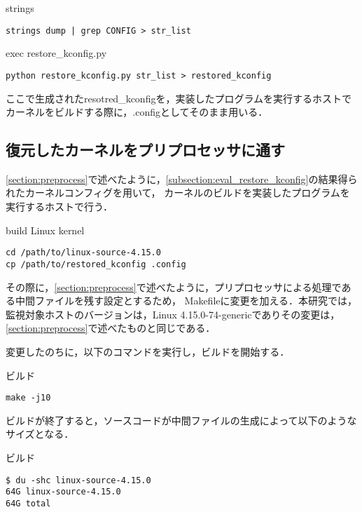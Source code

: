 \begin{itembox}[l]{strings}
    \begin{verbatim}
strings dump | grep CONFIG > str_list
    \end{verbatim}
\end{itembox}

\begin{itembox}[l]{exec restore_kconfig.py}
    \begin{verbatim}
python restore_kconfig.py str_list > restored_kconfig
    \end{verbatim}
\end{itembox}

ここで生成されたresotred_kconfigを，実装したプログラムを実行するホストでカーネルをビルドする際に，.configとしてそのまま用いる．

\subsection{復元したカーネルをプリプロセッサに通す}

\ref{section:preprocess}で述べたように，\ref{subsection:eval_restore_kconfig}の結果得られたカーネルコンフィグを用いて，
カーネルのビルドを実装したプログラムを実行するホストで行う．

\begin{itembox}[l]{build Linux kernel}
    \begin{verbatim}
cd /path/to/linux-source-4.15.0
cp /path/to/restored_kconfig .config
    \end{verbatim}
\end{itembox}

その際に，\ref{section:preprocess}で述べたように，プリプロセッサによる処理である中間ファイルを残す設定とするため，
Makefileに変更を加える．本研究では，監視対象ホストのバージョンは，Linux 4.15.0-74-genericでありその変更は，\ref{section:preprocess}で述べたものと同じである．

変更したのちに，以下のコマンドを実行し，ビルドを開始する．

\begin{itembox}[l]{ビルド}
    \begin{verbatim}
make -j10
    \end{verbatim}
\end{itembox}

ビルドが終了すると，ソースコードが中間ファイルの生成によって以下のようなサイズとなる．

\begin{itembox}[l]{ビルド}
    \begin{verbatim}
$ du -shc linux-source-4.15.0
64G	linux-source-4.15.0
64G	total
    \end{verbatim}
\end{itembox}

